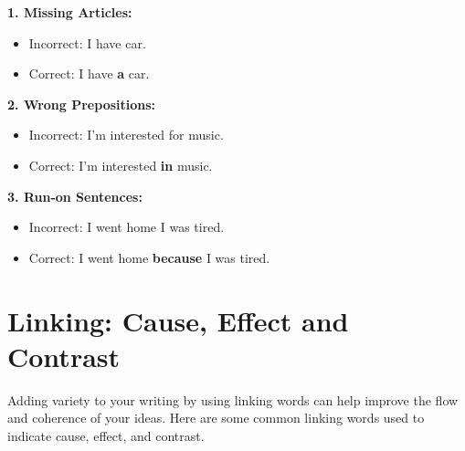 \begin{grammarbox}[title=Error Correction Guide]
\textbf{1. Missing Articles:}
\begin{itemize}
    \item Incorrect: I have car.
    \item Correct: I have \textbf{a} car.
\end{itemize}

\textbf{2. Wrong Prepositions:}
\begin{itemize}
    \item Incorrect: I'm interested for music.
    \item Correct: I'm interested \textbf{in} music.
\end{itemize}

\textbf{3. Run-on Sentences:}
\begin{itemize}
    \item Incorrect: I went home I was tired.
    \item Correct: I went home \textbf{because} I was tired.
\end{itemize}
\end{grammarbox}

\section{Linking: Cause, Effect and Contrast}

Adding variety to your writing by using linking words can help improve the flow and coherence of your ideas. Here are some common linking words used to indicate cause, effect, and contrast.

